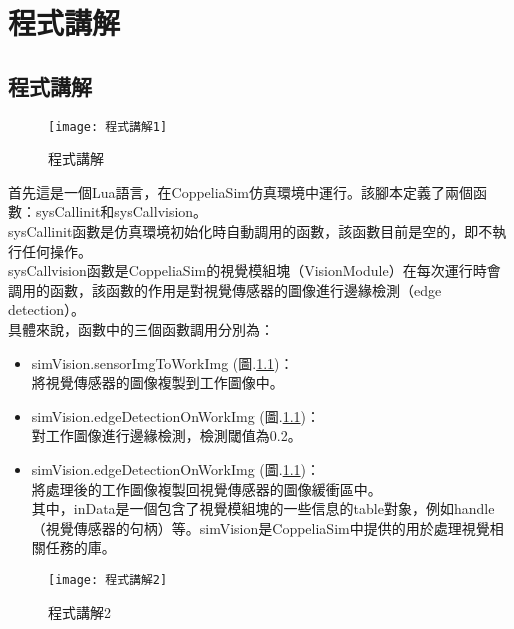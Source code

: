 \chapter{程式講解}
\section{程式講解}
\begin{figure}[hbt!]
\begin{center}
\texttt{[image: 程式講解1]}
\caption{\Large 程式講解}\label{程式講解}
\end{center}
\end{figure} 
首先這是一個Lua語言，在CoppeliaSim仿真環境中運行。該腳本定義了兩個函數：sysCallinit和sysCallvision。
\\
sysCallinit函數是仿真環境初始化時自動調用的函數，該函數目前是空的，即不執行任何操作。
\\
sysCallvision函數是CoppeliaSim的視覺模組塊（VisionModule）在每次運行時會調用的函數，該函數的作用是對視覺傳感器的圖像進行邊緣檢測（edge detection）。\\具體來說，函數中的三個函數調用分別為：
\begin{itemize}
\item simVision.sensorImgToWorkImg (圖.\ref{程式講解})：\\
將視覺傳感器的圖像複製到工作圖像中。\\
\item simVision.edgeDetectionOnWorkImg (圖.\ref{程式講解})：\\
對工作圖像進行邊緣檢測，檢測閾值為0.2。\\
\item simVision.edgeDetectionOnWorkImg (圖.\ref{程式講解})：\\
將處理後的工作圖像複製回視覺傳感器的圖像緩衝區中。\\
其中，inData是一個包含了視覺模組塊的一些信息的table對象，例如handle（視覺傳感器的句柄）等。simVision是CoppeliaSim中提供的用於處理視覺相關任務的庫。\\
\end{itemize}
\begin{figure}[hbt!]
\begin{center}
\texttt{[image: 程式講解2]}
\caption{\Large 程式講解2}\label{程式講解2}
\end{center}
\end{figure} 

